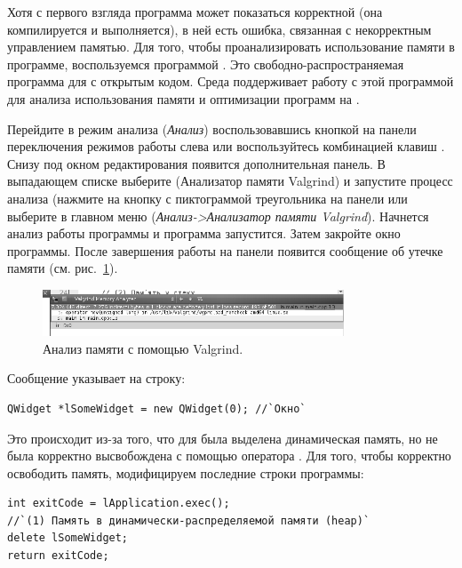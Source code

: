 Хотя с первого взгляда программа может показаться корректной (она компилируется и выполняется), в ней есть ошибка,
связанная с некорректным управлением памятью. Для того, чтобы проанализировать использование памяти в программе,
воспользуемся программой . Это свободно-распространяемая программа для  с открытым кодом.
Среда  поддерживает работу с этой программой для анализа использования памяти 
и оптимизации программ на .

Перейдите в режим анализа  (\emph{Анализ}) воспользовавшись кнопкой на панели
переключения режимов работы слева или воспользуйтесь комбинацией клавиш . Снизу под окном
редактирования появится дополнительная панель. В выпадающем списке выберите  (Анализатор памяти
Valgrind) и запустите процесс анализа (нажмите на кнопку с пиктограммой треугольника на панели или выберите в главном
меню  (\emph{Анализ->Анализатор памяти Valgrind}). Начнется анализ работы программы и программа запустится. Затем закройте окно программы. После
завершения работы на панели появится сообщение об утечке памяти (см. рис.~\ref{ch14:refDrawing0}).
\begin{figure}[htb]
\begin{center}
\includegraphics[width=0.8\textwidth]{img/ris_14_1}
\caption[Анализ памяти с помощью Valgrind]{Анализ памяти с помощью Valgrind.}
\label{ch14:refDrawing0}
\end{center}
\end{figure}

Сообщение указывает на строку: 
\begin{lstlisting}
QWidget *lSomeWidget = new QWidget(0); //`Окно`
\end{lstlisting}

Это происходит из-за того, что для  была выделена динамическая память, но не была корректно
высвобождена с помощью оператора . Для того, чтобы корректно освободить память, модифицируем последние
строки программы:
\begin{lstlisting}
int exitCode = lApplication.exec();
//`(1) Память в динамически-распределяемой памяти (heap)`
delete lSomeWidget;
return exitCode;
\end{lstlisting}

